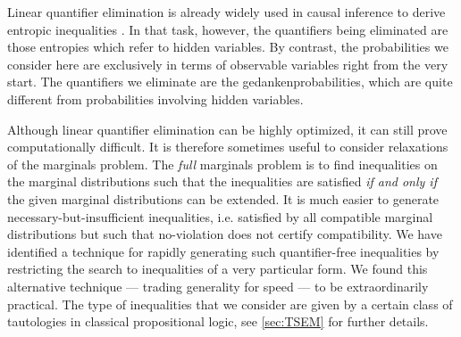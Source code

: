 Linear quantifier elimination is already widely used in causal inference to derive entropic inequalities \cite{fritz2013marginal,chaves2014novel,chaves2014informationinference}. In that task, however, the quantifiers being eliminated are those entropies which refer to hidden variables. By contrast, the probabilities we consider here are exclusively in terms of observable variables right from the very start. The quantifiers we eliminate are the gedankenprobabilities, which are quite different from probabilities involving hidden variables.

Although linear quantifier elimination can be highly optimized, it can still prove computationally difficult. It is therefore sometimes useful to consider relaxations of the marginals problem. The \emph{full} marginals problem is to find inequalities on the marginal distributions such that the inequalities are satisfied \emph{if and only if} the given marginal distributions can be extended. It is much easier to generate necessary-but-insufficient inequalities, i.e. satisfied by all compatible marginal distributions but such that no-violation does not certify compatibility. We have identified a technique for rapidly generating such quantifier-free inequalities by restricting the search to inequalities of a very particular form. We found this alternative technique — trading generality for speed — to be extraordinarily practical. The type of inequalities that we consider are given by a certain class of tautologies in classical propositional logic, see \cref{sec:TSEM} for further details.






